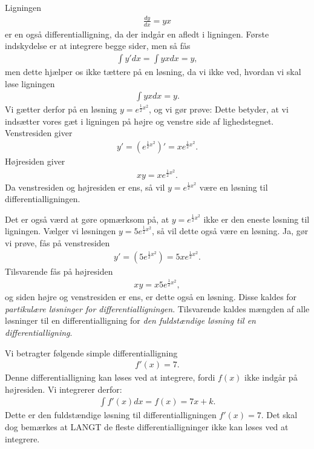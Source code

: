 \begin{exa}
Ligningen
\begin{align*}
	\frac{d y}{d x} = yx
\end{align*}
er en også differentialligning, da der indgår en afledt i ligningen. Første indskydelse er at integrere begge sider, men så fås
\begin{align*}
	\int y' d x =\int yx d x = y,
\end{align*}
men dette hjælper os ikke tættere på en løsning, da vi ikke ved, hvordan vi skal løse ligningen
\begin{align*}
	\int y x d x = y.
\end{align*}
Vi gætter derfor på en løsning $y = e^{\frac{1}{2}x^2}$, og vi gør prøve: Dette betyder, at vi indsætter vores gæt i ligningen på højre og venstre side af lighedstegnet.
Venstresiden giver
\begin{align*}
	y' = \left(e^{\frac{1}{2}x^2}\right)' = xe^{\frac{1}{2}x^2}.
\end{align*}
Højresiden giver
\begin{align*}
	xy = xe^{\frac{1}{2}x^2}.
\end{align*}
Da venstresiden og højresiden er ens, så vil $y=e^{\frac{1}{2}x^2}$ være en løsning til differentialligningen. 

Det er også værd at gøre opmærksom på, at $y=e^{\frac{1}{2}x^2}$ ikke er den eneste løsning til ligningen. Vælger vi løsningen $y=5e^{\frac{1}{2}x^2}$, så vil dette også være en løsning. Ja, gør vi prøve, fås på venstresiden
\begin{align*}
	y' = \left(5e^{\frac{1}{2}x^2}\right) = 5xe^{\frac{1}{2}x^2}.
\end{align*}
Tilsvarende fås på højresiden
\begin{align*}
	xy = x5e^{\frac{1}{2}x^2},
\end{align*}
og siden højre og venstresiden er ens, er dette også en løsning. Disse kaldes for \textit{partikulære løsninger for differentialligningen}. Tilsvarende kaldes mængden af alle løsninger til en differentialligning for \textit{den fuldstændige løsning til en differentialligning}.
\end{exa}

\begin{exa}
Vi betragter følgende simple differentialligning
\begin{align*}
f'(x) = 7.
\end{align*}
Denne differentialligning kan løses ved at integrere, fordi $f(x)$ ikke indgår på højresiden. Vi integrerer derfor:
\begin{align*}
	\int f'(x)d x = f(x) = 7x + k.
\end{align*}
Dette er den fuldstændige løsning til differentialligningen $f'(x) = 7.$ Det skal dog bemærkes at LANGT de fleste differentialligninger ikke kan løses ved at integrere. 
\end{exa}

